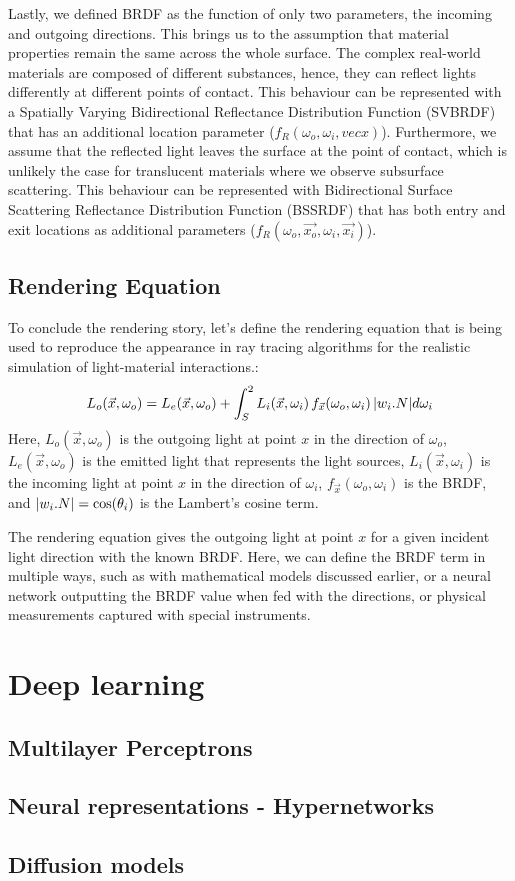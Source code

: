 Lastly, we defined BRDF as the function of only two parameters, the incoming and outgoing directions. This brings us to the assumption that material properties remain the same across the whole surface. The complex real-world materials are composed of different substances, hence, they can reflect lights differently at different points of contact. This behaviour can be represented with a Spatially Varying Bidirectional Reflectance Distribution Function (SVBRDF) that has an additional location parameter ($f_R(\omega_o, \omega_i,  vec{x})$). Furthermore, we assume that the reflected light leaves the surface at the point of contact, which is unlikely the case for translucent materials where we observe subsurface  scattering. This behaviour can be represented with Bidirectional Surface Scattering Reflectance Distribution Function (BSSRDF) that has both entry and exit locations as additional parameters ($f_R(\omega_o, \vec{x_o}, \omega_i,  \vec{x_i})$). 

\subsection{Rendering Equation}

To conclude the rendering story, let's define the rendering equation that is being used to reproduce the appearance in ray tracing algorithms for the realistic simulation of light-material interactions.:
\begin{equation}
L_o(\vec{x}, \omega_o) = L_e(\vec{x}, \omega_o)  +  \int_S^2 L_i(\vec{x}, \omega_i) \, f_{\vec{x}}(\omega_o,  \omega_i) \, \lvert w_i . N\rvert d\omega_i
\label{eqn:rendering-eqn}
\end{equation}
Here, $L_o(\vec{x}, \omega_o) $ is the outgoing light at point $x$ in the direction of $\omega_o$, $L_e(\vec{x}, \omega_o)$ is the emitted light that represents the light sources, $L_i(\vec{x}, \omega_i) $ is the incoming light at point $x$ in the direction of $\omega_i$, $f_{\vec{x}}(\omega_o,  \omega_i)$ is the BRDF, and $\lvert w_i . N\rvert = \cos(\theta_i)$ is the Lambert's cosine term.

The rendering equation gives the outgoing light at point $x$ for a given incident light direction with the known BRDF. Here, we can define the BRDF term in multiple ways, such as with mathematical models discussed earlier, or a neural network outputting the BRDF value when fed with the directions, or physical measurements captured with special instruments. 

\section{Deep learning}
\subsection{Multilayer Perceptrons}
\subsection{Neural representations - Hypernetworks}
\subsection{Diffusion models}